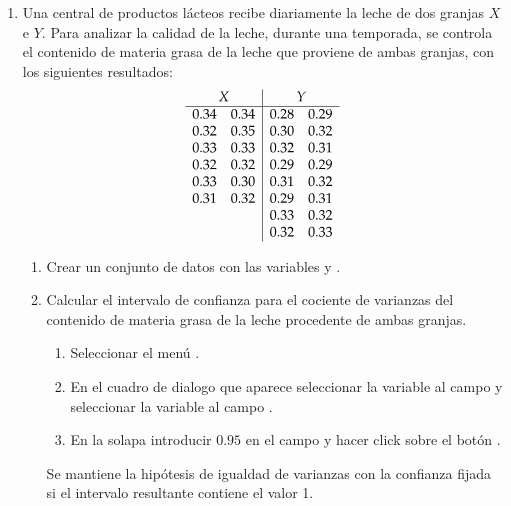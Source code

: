 \begin{enumerate}[leftmargin=*]
\item  Una central de productos lácteos recibe diariamente la leche de dos granjas $X$ e $Y$. Para analizar la calidad de
la leche, durante una temporada, se controla el contenido de materia grasa de la leche que proviene de ambas granjas, con
los siguientes resultados:
\[
\begin{array}{ll|ll}
\multicolumn{2}{c|}{X} & \multicolumn{2}{c}{Y} \\
\hline
0.34 & 0.34 & 0.28 & 0.29 \\
0.32 & 0.35 & 0.30 & 0.32 \\
0.33 & 0.33 & 0.32 & 0.31 \\
0.32 & 0.32 & 0.29 & 0.29 \\
0.33 & 0.30 & 0.31 & 0.32 \\
0.31 & 0.32 & 0.29 & 0.31 \\
 &  & 0.33 & 0.32 \\
 &  & 0.32 & 0.33 \\
\end{array}
\]

\begin{enumerate}
\item Crear un conjunto de datos con las variables  y .

\item Calcular el intervalo de confianza para el cociente de varianzas del contenido de materia grasa de la leche procedente de ambas
granjas. 
\begin{indicacion}
\begin{enumerate}
\item Seleccionar el menú .
\item En el cuadro de dialogo que aparece seleccionar la variable  al campo  y seleccionar la variable  al campo .
\item En la solapa  introducir $0.95$ en el campo  y hacer click sobre el botón .
\end{enumerate}
Se mantiene la hipótesis de igualdad de varianzas con la confianza fijada si el intervalo resultante contiene el valor 1. 
\end{indicacion}


\end{enumerate}
\end{enumerate}
